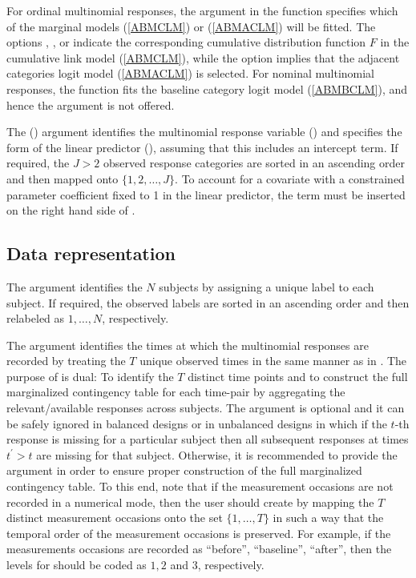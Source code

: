 \documentclass[
]{jss}
\begin{document}
For ordinal multinomial responses, the  argument in the
function  specifies which of the marginal models
(\ref{ABMCLM}) or (\ref{ABMACLM}) will be fitted. The options
, ,  or 
indicate the corresponding cumulative distribution function \(F\) in the
cumulative link model (\ref{ABMCLM}), while the option 
implies that the adjacent categories logit model (\ref{ABMACLM}) is
selected. For nominal multinomial responses, the function
 fits the baseline category logit model (\ref{ABMBCLM}),
and hence the  argument is not offered.

The  () argument identifies
the multinomial response variable () and specifies the
form of the linear predictor (), assuming that this
includes an intercept term. If required, the \(J>2\) observed response
categories are sorted in an ascending order and then mapped onto
\(\{1,2,\ldots,J\}\). To account for a covariate  with a
constrained parameter coefficient fixed to 1 in the linear predictor,
the term  must be inserted on the right hand side of
.

\hypertarget{data-representation}{%
\subsection{Data representation}\label{data-representation}}

The  argument identifies the \(N\) subjects by assigning a
unique label to each subject. If required, the observed  labels
are sorted in an ascending order and then relabeled as \(1,\ldots,N\),
respectively.

The  argument identifies the times at which the
multinomial responses are recorded by treating the \(T\) unique observed
times in the same manner as in . The purpose of 
is dual: To identify the \(T\) distinct time points and to construct the
full marginalized contingency table for each time-pair by aggregating
the relevant/available responses across subjects. The 
argument is optional and it can be safely ignored in balanced designs or
in unbalanced designs in which if the \(t\)-th response is missing for a
particular subject then all subsequent responses at times
\(t^{\prime}>t\) are missing for that subject. Otherwise, it is
recommended to provide the  argument in order to ensure
proper construction of the full marginalized contingency table. To this
end, note that if the measurement occasions are not recorded in a
numerical mode, then the user should create  by mapping
the \(T\) distinct measurement occasions onto the set \(\{1,\ldots,T\}\)
in such a way that the temporal order of the measurement occasions is
preserved. For example, if the measurements occasions are recorded as
``before'', ``baseline'', ``after'', then the levels for 
should be coded as \(1,2\) and \(3\), respectively.
\end{document}
